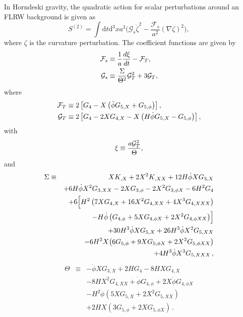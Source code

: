 \documentclass[nofootinbib,aps,a4paper,letterpaper,superscriptaddress,
twocolumn,times]{revtex4}
\renewcommand{\(}{\left(}
\renewcommand{\)}{\right)}
\renewcommand{\(}{\left(}
\renewcommand{\)}{\right)}
\renewcommand{\[}{\left[}
\renewcommand{\]}{\right]}
\begin{document}
In Horndeski gravity, the quadratic action for 
 scalar perturbations around an FLRW background is given 
as \cite{Kobayashi:2011nu}
\begin{equation}\label{eq:S_pert_1App}
    S^{(2)}=\int \mathrm{d}t \mathrm{d}^3x a^3 \bigg(\mathcal{G}_s 
\dot{\zeta}^2  -\frac{\mathcal{F}_s}{a^2} (\nabla \zeta)^2 \bigg),
\end{equation}
where $\zeta$ is the curvature 
perturbation. 
The coefficient functions are given by \cite{Kobayashi:2016xpl, Akama:2018cqv}
\begin{align}
{\cal F}_s &\equiv\frac{1}{a}\frac{d\xi}{dt}-{\cal F}_T,
\label{F_scon}
\\
{\cal G}_s &\equiv \frac{\Sigma }{\Theta^2}{\cal G}_T^2+3{\cal G}_T
\label{G_scon},
\end{align}
where
\begin{align}
{\cal F}_T&\equiv2 \left[ G_4-X \left(\ddot\phi 
G_{5,X}+G_{5,\phi}\right)\right],
\\
{\cal G}_T&\equiv2 \left[ G_4-2XG_{4,X}-X \left(H\dot\phi 
G_{5,X}-G_{5,\phi}\right)\right],
\end{align}
with
\begin{align}
\xi\equiv \frac{a{\cal G}_T^2}{\Theta},
\label{xi}
\end{align}
and 
 \begin{eqnarray}
\Sigma&\equiv&XK_{,X}+2X^2K_{,XX}+12H\dot\phi XG_{3,X}
\nonumber\\&&
+6H\dot\phi X^2G_{3,XX}
-2XG_{3,\phi}-2X^2G_{3,\phi X}-6H^2G_4
\nonumber\\&&
+6\Bigl[H^2\left(7XG_{4,X}+16X^2G_{4,XX}+4X^3G_{4,XXX}\right)
\nonumber\\
&&
\ \ \ \ \ \,
-H\dot\phi\left(G_{4,\phi}+5XG_{4,\phi X}+2X^2G_{4,\phi XX}\right)
\Bigr]
\nonumber\\&&
+30H^3\dot\phi XG_{5,X}+26H^3\dot\phi X^2G_{5,XX}
\nonumber\\&&
-6H^2X\bigl(6G_{5,\phi}
+9XG_{5,\phi X}+2 X^2G_{5,\phi XX}\bigr)
\nonumber\\&&
+4H^3\dot\phi X^3G_{5,XXX}\,,
\end{eqnarray}
 \begin{eqnarray}
\Theta
&\equiv&-\dot\phi XG_{3,X}+
2HG_4-8HXG_{4,X}
\nonumber\\&&
-8HX^2G_{4,XX}+\dot\phi G_{4,\phi}+2X\dot\phi G_{4,\phi X}
\nonumber\\&&
-H^2\dot\phi\left(5XG_{5,X}+2X^2G_{5,XX}\right)
\nonumber\\&&
+2HX\left(3G_{5,\phi}+2XG_{5,\phi X}\right)\,.
\label{theta}
\end{eqnarray}








 

 
\end{document}

